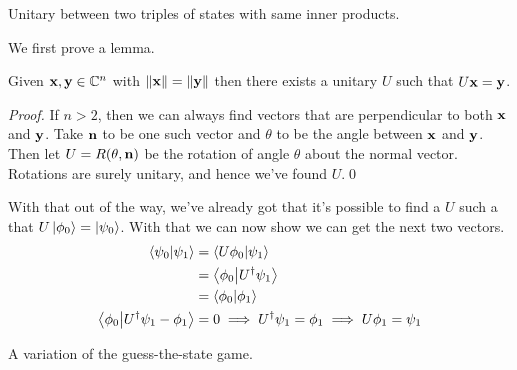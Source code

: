 \documentclass[boxes,pages]{homework}
\begin{document}
\begin{problem}
Unitary between two triples of states with same inner products.
\end{problem}

\begin{solution}
	We first prove a lemma.
	\begin{lemma}
		Given $\vb{x}, \vb{y}\in\mathbb{C}^n$ with $\norm{\vb{x}} = \norm{\vb{y}}$ then there exists a unitary $U$ such that $U\vb{x} = \vb{y}$.
	\end{lemma}
	\begin{proof}
		If $n > 2$, then we can always find vectors that are perpendicular to both $\vb{x}$ and $\vb{y}$. Take $\vb{n}$ to be one such vector and $\theta$ to be the angle between $\vb{x}$ and $\vb{y}$. Then let $U = R(\theta, \vb{n})$ be the rotation of angle $\theta$ about the normal vector. Rotations are surely unitary, and hence we've found $U$.\hfill\qed
	\end{proof}
	With that out of the way, we've already got that it's possible to find a $U$ such a that $U\ket{\phi_0} = \ket{\psi_0}$. With that we can now show we can get the next two vectors.
	\begin{align*}
		\braket{\psi_0}{\psi_1} & = \braket{U\phi_0}{\psi_1} \\
		 & = \braket{\phi_0}{U^\dagger \psi_1} \\
		 & = \braket{\phi_0}{\phi_1} \\
		\braket{\phi_0}{U^\dagger \psi_1 - \phi_1} & = 0 \implies U^\dagger\psi_1 = \phi_1 \implies U\phi_1 = \psi_1
	\end{align*}
\end{solution}

\begin{problem}
A variation of the guess-the-state game.
\end{problem}

\begin{solution}
\end{solution}
\end{document}
